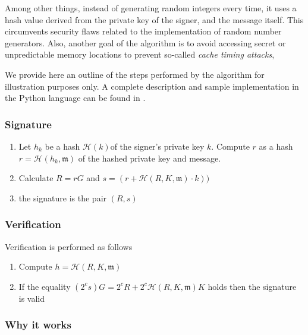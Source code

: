 Among other things, instead of generating random integers every time, it uses a hash value derived from the private key of the signer, 
and the message itself. This circumvents security flaws related to the implementation of random number generators.
Also, another goal of the algorithm is to avoid accessing secret or unpredictable memory locations to prevent so-called {\em cache timing attacks},

We provide here an outline of the steps performed by the algorithm for illustration purposes only.
A complete description and sample implementation in the Python language can be found in \cite{rfc8032}. 

\subsubsection{Signature}

\begin{enumerate}
	
	\item Let \(h_k\) be a hash \(\mathcal{H}(k)\)of the signer's private key \(k\). 
	Compute \(r\) as a hash \(r = \mathcal{H}(h_k,  \mathfrak{m})\)  of the hashed private key and message.
	
	\item Calculate \(R = r G\) and \(s = (r + \mathcal{H}(R, K,  \mathfrak{m}) \cdot k)) \)
	
	\item the signature is the pair \((R, s)\)
	
	
\end{enumerate}



\subsubsection{Verification}
Verification is performed as follows

\begin{enumerate}
	
	\item Compute \(h = \mathcal{H}(R,  K,  \mathfrak{m}) \)
	
	\item If the equality \((2^c s) G = 2^c R + 2^c \mathcal{H}(R, K,  \mathfrak{m}) K \) holds then the signature is valid
	
\end{enumerate}



\subsubsection{Why it works}

